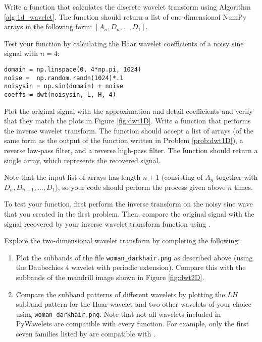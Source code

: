 
Write a function that calculates the discrete wavelet transform using Algorithm \ref{alg:1d_wavelet}.
The function should return a list of one-dimensional NumPy arrays in the following form: $[A_n, D_n, \ldots, D_1]$.


Test your function by calculating the Haar wavelet coefficients of a noisy sine signal with $n=4$:

\begin{lstlisting}
domain = np.linspace(0, 4*np.pi, 1024)
noise =  np.random.randn(1024)*.1
noisysin = np.sin(domain) + noise
coeffs = dwt(noisysin, L, H, 4)
\end{lstlisting}

Plot the original signal with the approximation and detail coefficients and verify that they match the plots in Figure \ref{fig:dwt1D}.
\label{prob:dwt1D}
Write a function that performs the inverse wavelet transform.
The function should accept a list of arrays (of the same form as the output of the function written in Problem \ref{prob:dwt1D}), a reverse low-pass filter, and a reverse high-pass filter.
The function should return a single array, which represents the recovered signal.

Note that the input list of arrays has length $n+1$ (consisting of $A_n$ together with $D_n, D_{n-1}, \ldots, D_1$), so your code should perform the process given above $n$ times.

To test your function, first perform the inverse transform on the noisy sine wave that you created in the first problem.
Then, compare the original signal with the signal recovered by your inverse wavelet transform function using .

Explore the two-dimensional wavelet transform by completing the following:
\begin{enumerate}
    \item Plot the subbands of the file \texttt{woman\_darkhair.png} as described above (using the Daubechies 4 wavelet with periodic extension).
        Compare this with the subbands of the mandrill image shown in Figure \ref{fig:dwt2D}.
    \item Compare the subband patterns of different wavelets by plotting the $LH$ subband pattern for the Haar wavelet and two other wavelets of your choice using \texttt{woman\_darkhair.png}.
        Note that not all wavelets included in PyWavelets are compatible with every function.
        For example, only the first seven families listed by  are compatible with .
\end{enumerate}


